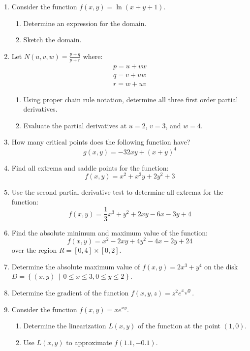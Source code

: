 \documentclass[letterpaper,12pt,fleqn]{article}
\newcommand{\setb}[2]{\left\{{#1}\,\middle|\,{#2}\right\}}
\begin{document}
\begin{enumerate}
\item Consider the function \(f(x,y)=\ln(x+y+1)\).
  \begin{enumerate}
  \item Determine an expression for the domain.
  \item Sketch the domain.
  \end{enumerate}

\item Let \(\displaystyle N(u,v,w)=\frac{p+q}{p+r}\) where:
  \begin{gather*}
    p=u+vw \\
    q=v+uw \\
    r=w+uv
  \end{gather*}
  \begin{enumerate}
  \item Using proper chain rule notation, determine all three first order partial derivatives.
  \item Evaluate the partial derivatives at \(u=2\), \(v=3\), and \(w=4\).
  \end{enumerate}

\item How many critical points does the following function have?
  \[g(x,y)=-32xy+(x+y)^4\]

\item Find all extrema and saddle points for the function:
  \[f(x,y)=x^2+x^2y+2y^2+3\]

\item Use the second partial derivative test to determine all extrema for the function:
  \[f(x,y)=\frac{1}{3}x^3+y^2+2xy-6x-3y+4\]

\item Find the absolute minimum and maximum value of the function:
  \[f(x,y)=x^2-2xy+4y^2-4x-2y+24\]
  over the region \(R=[0,4]\times[0,2]\).

\item Determine the absolute maximum value of \(f(x,y)=2x^3+y^4\) on the disk
  \(D=\setb{(x,y)}{0\le x\le3,0\le y\le2}\).

\item Determine the gradient of the function \(f(x,y,z)=z^2e^{x\sqrt{y}}\).

\item Consider the function \(f(x,y)=xe^{xy}\).
  \begin{enumerate}
  \item Determine the linearization \(L(x,y)\) of the function  at the point \((1,0)\).
  \item Use \(L(x,y)\) to approximate \(f(1.1,-0.1)\).
  \end{enumerate}


\end{enumerate}
\end{document}
